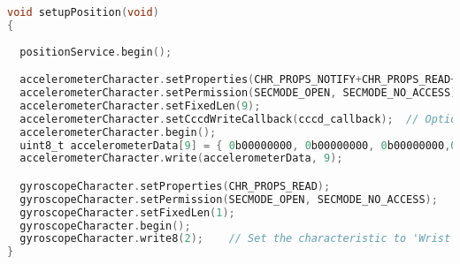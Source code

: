 
\begin{lstlisting}[float,language=C,caption=Gửi dữ liệu từ BLE, label=sendBle,captionpos=b]
void setupPosition(void)
{
 
  positionService.begin();

  accelerometerCharacter.setProperties(CHR_PROPS_NOTIFY+CHR_PROPS_READ+CHR_PROPS_WRITE );
  accelerometerCharacter.setPermission(SECMODE_OPEN, SECMODE_NO_ACCESS);
  accelerometerCharacter.setFixedLen(9);
  accelerometerCharacter.setCccdWriteCallback(cccd_callback);  // Optionally capture CCCD updates
  accelerometerCharacter.begin();
  uint8_t accelerometerData[9] = { 0b00000000, 0b00000000, 0b00000000,0b00000000,0b00000000,0b00000000,0b00000000,0b00000000,0b00000000}; // Set the characteristic to use 8-bit values, with the sensor connected and detected
  accelerometerCharacter.write(accelerometerData, 9);

  gyroscopeCharacter.setProperties(CHR_PROPS_READ);
  gyroscopeCharacter.setPermission(SECMODE_OPEN, SECMODE_NO_ACCESS);
  gyroscopeCharacter.setFixedLen(1);
  gyroscopeCharacter.begin();
  gyroscopeCharacter.write8(2);    // Set the characteristic to 'Wrist' (2)
}

\end{lstlisting}
